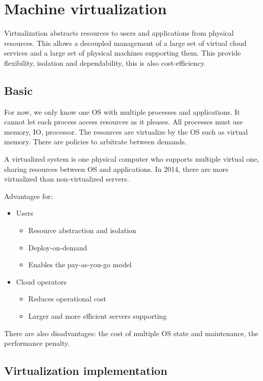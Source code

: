 \section{Machine virtualization}

Virtualization abstracts resources to users and applications from physical resources. This allows a decoupled management of a large set of virtual cloud services and a large set of physical machines supporting them. This provide flexibility, isolation and dependability, this is also cost-efficiency.

\subsection{Basic}

For now, we only know one OS with multiple processes and applications. It cannot let each process access resources as it pleases. All processes must use memory, IO, processor. The resources are virtualize by the OS such as virtual memory. There are policies to arbitrate between demands.

A virtualized system is one physical computer who supports multiple virtual one, sharing resources between OS and applications. In 2014, there are more virtualized than non-virtualized servers.

Advantages for:
\begin{itemize}
    \item Users
    \begin{itemize}
        \item Resource abstraction and isolation
        \item Deploy-on-demand
        \item Enables the pay-as-you-go model
    \end{itemize}
    \item Cloud operators
    \begin{itemize}
        \item Reduces operational cost
        \item Larger and more efficient servers supporting
    \end{itemize}
\end{itemize}

There are also disadvantages: the cost of multiple OS state and maintenance, the performance penalty.

\subsection{Virtualization implementation}

